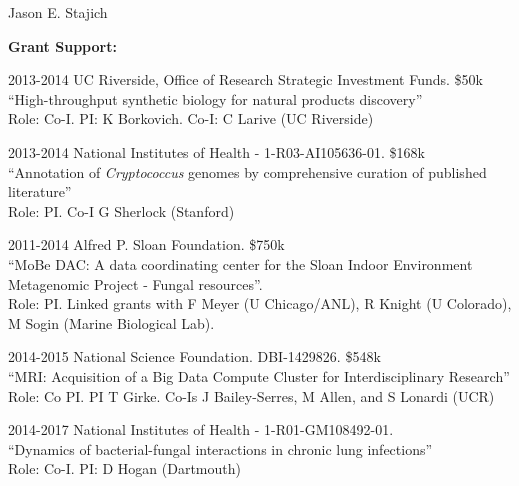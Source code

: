 \documentclass[10pt]{article}
\begin{document}
\begin{cv}{\centerline{Jason E. Stajich}}
\begin{cvlistcompact}{\bf Grant Support:}
\item [2013-2014] UC Riverside, Office of Research Strategic Investment
  Funds. \$50k \\
``High-throughput synthetic biology for natural products discovery'' \\
Role: Co-I. PI: K Borkovich. Co-I: C Larive (UC Riverside)

\item [2013-2014] National Institutes of Health - 1-R03-AI105636-01. \$168k \\
``Annotation of \textit{Cryptococcus} genomes by comprehensive
  curation of published literature'' \\
Role: PI. Co-I G Sherlock (Stanford)

  \item [2011-2014] Alfred P. Sloan Foundation. \$750k \\
``MoBe DAC: A data coordinating center for the Sloan Indoor
Environment Metagenomic Project - Fungal resources''. \\
Role: PI.  Linked grants with F Meyer (U Chicago/ANL), R Knight (U Colorado), M Sogin (Marine Biological Lab).

\item [2014-2015] National Science Foundation. DBI-1429826. \$548k \\
``MRI: Acquisition of a Big Data Compute Cluster for Interdisciplinary
  Research''
Role: Co PI. PI T Girke. Co-Is J Bailey-Serres, M Allen, and S Lonardi (UCR)

\item [2014-2017] National Institutes of Health - 1-R01-GM108492-01. \\
``Dynamics of bacterial-fungal interactions in chronic lung infections'' \\
Role: Co-I. PI: D Hogan (Dartmouth)

\setlength{\cvlabelwidth}{18mm}


\end{cvlistcompact}
\end{cv}
\end{document}
